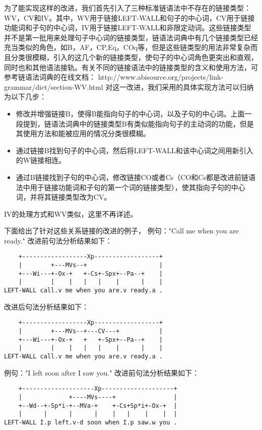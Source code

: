 为了能实现这样的改进，我们首先引入了三种标准链语法中不存在的链接类型：WV，CV和IV。其中，WV用于链接LEFT-WALL和句子的中心词，CV用于链接功能词和子句的中心词，IV用于链接LEFT-WALL和非限定动词。这些链接类型并不是第一批用来处理句子中心词的链接类型，链语法词典中有几个链接类型已经充当类似的角色，如B，AF，CP,Eq，COq等，但是这些链类型的用法非常复杂而且分类很模糊，引入的这几个新的链接类型，使句子的中心词角色更突出和直观，同时也和其他语法接轨。有关不同的链接语法中的链接类型的含义和使用方法，可参考链语法词典的在线文档： http://www.abisource.org/projects/link-grammar/dict/section-WV.html
对这一改进，我们采用的具体实现方法可以归纳为以下几步：
\begin{itemize}
\item 修改并增强链接B，使得B能指向句子的中心词，以及子句的中心词。上面一段提到，链语法词典中的链接类型B有类似能指向句子的主动词的功能，但是其使用方法和能被应用的情况分类很模糊。
\item 通过链接B找到句子的中心词，然后将LEFT-WALL和该中心词之间用新引入的W链接相连。
\item 通过B链接找到子句的中心词，修改链接CO或者Cs（CO和Cs都是改进前链语法中用于链接功能词和子句的第一个词的链接类型），使其指向子句的中心词，并将其链接类型改为CV。
\end{itemize}

IV的处理方式和WV类似，这里不再详述。

下面给出了针对这些关系链接的改进的例子，
例句："Call me when you are ready."
改进前句法分析结果如下：
\begin{verbatim}
    +------------------Xp------------------+
    |        +---MVs--+                    |
    +---Wi---+-Ox-+   +-Cs+-Spx+--Pa--+    |
    |        |    |   |   |    |      |    |
LEFT-WALL call.v me when you are.v ready.a .
\end{verbatim}

改进后句法分析结果如下：
\begin{verbatim}
    +------------------Xp------------------+
    |        +---MVs--+---CV---+           |
    +---Wi---+-Ox-+   +   +-Spx+--Pa--+    |
    |        |    |   |   |    |      |    |
LEFT-WALL call.v me when you are.v ready.a .
\end{verbatim}

例句："I left soon after I saw you."
改进前句法分析结果如下：
\begin{verbatim}
    +--------------------Xp--------------------+
    |             +----MVs----+                |
    +--Wd--+-Sp*i-+--MVa-+    +-Cs+Sp*i+-Ox-+  |
    |      |      |      |    |   |    |    |  |
LEFT-WALL I.p left.v-d soon when I.p saw.w you .
\end{verbatim}


